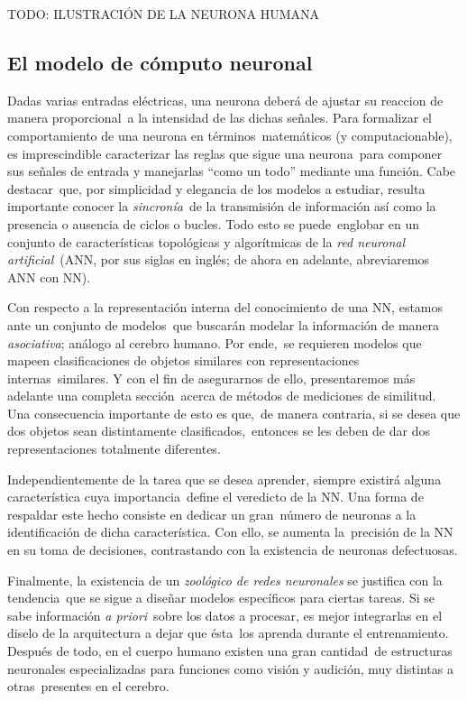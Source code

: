 TODO: ILUSTRACIÓN DE LA NEURONA HUMANA

\subsection{El modelo de cómputo neuronal}

Dadas varias entradas eléctricas, una neurona deberá de ajustar su reaccion de manera proporcional\
a la intensidad de las dichas señales. Para formalizar el comportamiento de una neurona en términos\
matemáticos (y computacionable), es imprescindible caracterizar las reglas que sigue una neurona\
para componer sus señales de entrada y manejarlas ``como un todo'' mediante una función. Cabe destacar\
que, por simplicidad y elegancia de los modelos a estudiar, resulta importante conocer la \emph{sincronía}\
de la transmisión de información así como la presencia o ausencia de ciclos o bucles. Todo esto se puede\
englobar en un conjunto de características topológicas y algorítmicas de la \emph{red neuronal artificial}\
(ANN, por sus siglas en inglés; de ahora en adelante, abreviaremos ANN con NN).\par
Con respecto a la representación interna del conocimiento de una NN, estamos ante un conjunto de modelos\
que buscarán modelar la información de manera \emph{asociativa}; análogo al cerebro humano. Por ende,\
se requieren modelos que mapeen clasificaciones de objetos similares con representaciones internas\
similares. Y con el fin de asegurarnos de ello, presentaremos más adelante una completa sección\
acerca de métodos de mediciones de similitud. Una consecuencia importante de esto es que,\
de manera contraria, si se desea que dos objetos sean distintamente clasificados,\
entonces se les deben de dar dos representaciones totalmente diferentes.\par
Independientemente de la tarea que se desea aprender, siempre existirá alguna característica cuya importancia\
define el veredicto de la NN. Una forma de respaldar este hecho consiste en dedicar un gran\
número de neuronas a la identificación de dicha característica. Con ello, se aumenta la\
precisión de la NN en su toma de decisiones, contrastando con la existencia de neuronas defectuosas.\par
Finalmente, la existencia de un \emph{zoológico de redes neuronales} se justifica con la tendencia\
que se sigue a diseñar modelos específicos para ciertas tareas. Si se sabe información \textit{a priori}\
sobre los datos a procesar, es mejor integrarlas en el diselo de la arquitectura a dejar que ésta\
los aprenda durante el entrenamiento. Después de todo, en el cuerpo humano existen una gran cantidad\
de estructuras neuronales especializadas para funciones como visión y audición, muy distintas a otras\
presentes en el cerebro.

